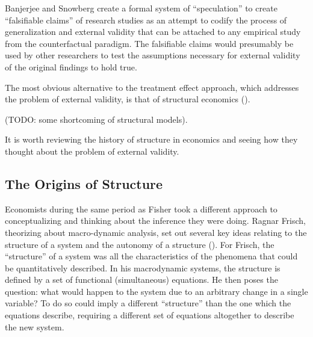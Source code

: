 \documentclass[a4paper,12pt]{article}
\begin{document}
Banjerjee and Snowberg \parencite*{Snowberg2016} create a formal system of ``speculation'' to create ``falsifiable claims'' of research studies as an attempt to codify the process of generalization and external validity that can be attached to any empirical study from the counterfactual paradigm. The falsifiable claims would presumably be used by other researchers to test the assumptions necessary for external validity of the original findings to hold true. 

The most obvious alternative to the treatment effect approach, which addresses the problem of external validity, is that of structural economics (\cite{Heckman2008}).

(TODO: some shortcoming of structural models). 

It is worth reviewing the history of structure in economics and seeing how they thought about the problem of external validity.






\subsection*{The Origins of Structure}

Economists during the same period as Fisher took a different approach to conceptualizing and thinking about the inference they were doing. Ragnar Frisch, theorizing about macro-dynamic analysis, set out several key ideas relating to the structure of a system and the autonomy of a structure (\cite{Frisch1995}). For Frisch, the ``structure'' of a system was all the characteristics of the phenomena that could be quantitatively described. In his macrodynamic systems, the structure is defined by a set of functional (simultaneous) equations. He then poses the question: what would happen to the system due to an arbitrary change in a single variable? To do so could imply a different ``structure'' than the one which the equations describe, requiring a different set of equations altogether to describe the new system.
\end{document}
